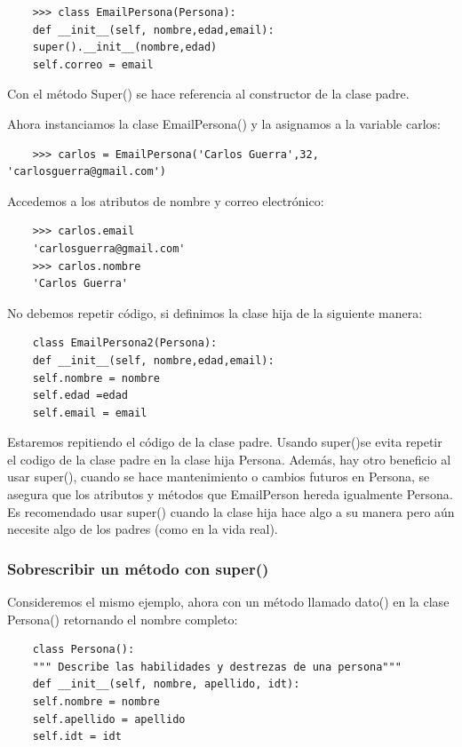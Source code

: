 {\begin{lstlisting}
	>>> class EmailPersona(Persona):
	def __init__(self, nombre,edad,email):
	super().__init__(nombre,edad)
	self.correo = email
\end{lstlisting}
Con el método {\ttfamily Super()} se hace referencia al constructor de la clase padre. 

Ahora instanciamos la clase {\ttfamily EmailPersona()} y la asignamos a la variable carlos:

\begin{lstlisting}
	>>> carlos = EmailPersona('Carlos Guerra',32, 'carlosguerra@gmail.com')
\end{lstlisting}

Accedemos  a los atributos de nombre y correo electrónico:

\begin{lstlisting}
	>>> carlos.email
	'carlosguerra@gmail.com'
	>>> carlos.nombre
	'Carlos Guerra'
\end{lstlisting}

No debemos repetir código, si definimos la clase hija de la siguiente manera: 

\begin{lstlisting}
	class EmailPersona2(Persona):
	def __init__(self, nombre,edad,email):
	self.nombre = nombre
	self.edad =edad
	self.email = email
\end{lstlisting}
Estaremos repitiendo el código de la clase padre. Usando  {\ttfamily super()}se evita repetir el codigo de la clase padre en la clase hija {\ttfamily Persona}. Además, hay otro beneficio al usar {\ttfamily super()}, cuando se hace mantenimiento o cambios  futuros en {\ttfamily Persona},  se asegura que los atributos y métodos que {\ttfamily EmailPerson} hereda igualmente {\ttfamily Persona}.
Es recomendado usar {\ttfamily super()} cuando la clase hija hace algo a su manera pero aún necesite algo de los padres (como en la vida real).\\


\subsubsection{Sobrescribir un método con super()} %

Consideremos el mismo ejemplo, ahora con un método llamado {\ttfamily dato()} en la clase {\ttfamily Persona()}
retornando el nombre completo:
\begin{lstlisting}
	class Persona():
	""" Describe las habilidades y destrezas de una persona"""
	def __init__(self, nombre, apellido, idt):
	self.nombre = nombre
	self.apellido = apellido
	self.idt = idt
	

\end{lstlisting}}
